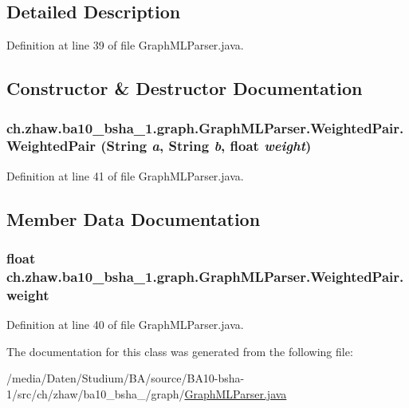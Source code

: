 \subsection{Detailed Description}


Definition at line 39 of file GraphMLParser.java.

\subsection{Constructor \& Destructor Documentation}
\hypertarget{classch_1_1zhaw_1_1ba10__bsha__1_1_1graph_1_1GraphMLParser_1_1WeightedPair_a00b32480b91236c865394640e3df3ebb}{
\subsubsection[{WeightedPair}]{\setlength{\rightskip}{0pt plus 5cm}ch.zhaw.ba10\_\-bsha\_\-1.graph.GraphMLParser.WeightedPair.WeightedPair (String {\em a}, \/  String {\em b}, \/  float {\em weight})}}
\label{classch_1_1zhaw_1_1ba10__bsha__1_1_1graph_1_1GraphMLParser_1_1WeightedPair_a00b32480b91236c865394640e3df3ebb}


Definition at line 41 of file GraphMLParser.java.

\subsection{Member Data Documentation}
\hypertarget{classch_1_1zhaw_1_1ba10__bsha__1_1_1graph_1_1GraphMLParser_1_1WeightedPair_ae275ca6ec6ffdb5d044cfd4d0765d8ea}{
\subsubsection[{weight}]{\setlength{\rightskip}{0pt plus 5cm}float {\bf ch.zhaw.ba10\_\-bsha\_\-1.graph.GraphMLParser.WeightedPair.weight}}}
\label{classch_1_1zhaw_1_1ba10__bsha__1_1_1graph_1_1GraphMLParser_1_1WeightedPair_ae275ca6ec6ffdb5d044cfd4d0765d8ea}


Definition at line 40 of file GraphMLParser.java.

The documentation for this class was generated from the following file:\begin{DoxyCompactItemize}
\item 
/media/Daten/Studium/BA/source/BA10-\/bsha-\/1/src/ch/zhaw/ba10\_\-bsha\_/graph/\hyperlink{GraphMLParser_8java}{GraphMLParser.java}\end{DoxyCompactItemize}
